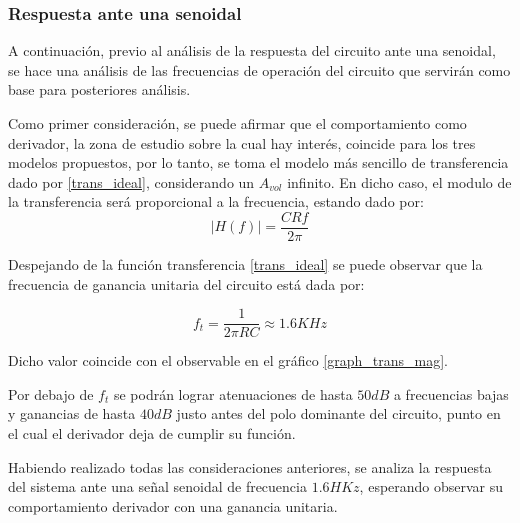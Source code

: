 \subsubsection{Respuesta ante una senoidal}
A continuación, previo al análisis de la respuesta del circuito ante una senoidal, se hace una análisis de las 
frecuencias de operación del circuito que servirán como base para posteriores análisis. \par 
Como primer consideración, se puede afirmar que el comportamiento como derivador, la zona de estudio sobre 
la cual hay interés, coincide para los tres modelos propuestos, por lo tanto, se toma el modelo más sencillo 
 de transferencia dado por \ref{trans_ideal}, considerando un $A_{vol}$ infinito. En dicho caso, el modulo
de la transferencia será proporcional a la frecuencia, estando dado por:
\vspace{2mm}
\begin{equation}
    |H(f)|=\frac{CRf}{2\pi}
    \label{frec_unitaria}
\end{equation}
\vspace{2mm}

Despejando de la función transferencia \ref{trans_ideal} se puede observar que la frecuencia de ganancia 
unitaria del circuito está dada por: 

\vspace{2mm}
\begin{equation}
    f_t=\frac{1}{2\pi RC} \approx 1.6KHz
    \label{frec_unitaria}
\end{equation}
\vspace{2mm}

Dicho valor coincide con el observable en el gráfico \ref{graph_trans_mag}. \par 
Por debajo de $f_t$ se podrán lograr atenuaciones de hasta $50dB$ a frecuencias bajas y ganancias de hasta 
$40dB$ justo antes del polo dominante del circuito, punto en el cual el derivador deja de cumplir su función. \par 
Habiendo realizado todas las consideraciones anteriores, se analiza la respuesta del sistema ante una señal senoidal
de frecuencia $1.6HKz$, esperando observar su comportamiento derivador con una ganancia unitaria.

